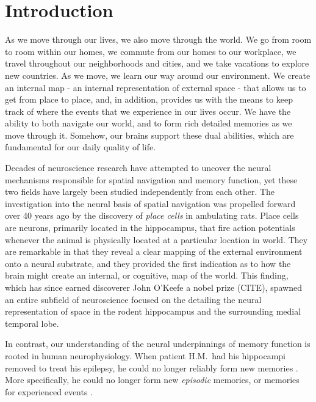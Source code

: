 \chapter{Introduction}



%
%
%

As we move through our lives, we also move through the world. We go from room to room within our homes, we commute from our homes to our workplace, we travel throughout our neighborhoods and cities, and we take vacations to explore new countries. As we move, we learn our way around our environment. We create an internal map - an internal representation of external space - that allows us to get from place to place, and, in addition, provides us with the means to keep track of where the events that we experience in our lives occur. We have the ability to both navigate our world, and to form rich detailed memories as we move through it. Somehow, our brains support these dual abilities, which are fundamental for our daily quality of life.

Decades of neuroscience research have attempted to uncover the neural mechanisms responsible for spatial navigation and memory function, yet these two fields have largely been studied independently from each other. The investigation into the neural basis of spatial navigation was propelled forward over 40 years ago by the discovery of \textit{place cells} \citep{OKeeDost71} in ambulating rats. Place cells are neurons, primarily located in the hippocampus, that fire action potentials whenever the animal is physically located at a particular location in world. They are remarkable in that they reveal a clear mapping of the external environment onto a neural substrate, and they provided the first indication as to how the brain might create an internal, or cognitive, map of the world. This finding, which has since earned discoverer John O'Keefe a nobel prize (CITE), spawned an entire subfield of neuroscience focused on the detailing the neural representation of space in the rodent hippocampus and the surrounding medial temporal lobe.

In contrast, our understanding of the neural underpinnings of memory function is rooted in human neurophysiology. When patient H.M.\ had his hippocampi removed to treat his epilepsy, he could no longer reliably form new memories \cite{ScovMiln57}. More specifically, he could no longer form new \textit{episodic} memories, or memories for experienced events \cite{Tulv72}.

